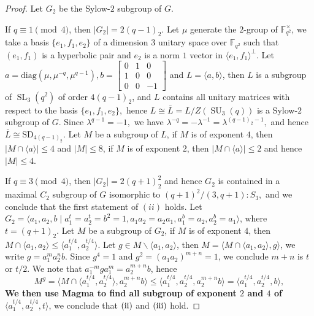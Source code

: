 \documentclass[12pt,reqno]{amsart}
\newcommand{\SL}{\operatorname{SL}}
\newcommand{\SU}{\operatorname{SU}}
\newcommand{\FF}{\mathbb{F}}
\newcommand{\lr}{\langle}
\newcommand{\rr}{\rangle}
\theoremstyle{plain}
\theoremstyle{definition}
\begin{document}
  \begin{proof}
  	Let $G_2$ be the Sylow-$2$ subgroup of $G$. 
  	
  	If $q\equiv 1 \pmod 4$, then $|G_2|=2(q-1)_2$. Let $\mu$ generate the $2$-group of $\FF_{q^2}^{\times}$, we take a basis $\{e_1,f_1,e_2\}$ of a dimension $3$ unitary space over $\FF_{q^2}$ such that $(e_1, f_1)$ is a hyperbolic pair and $e_2$ is a norm $1$ vector in $\lr e_1, f_1 \rr^{\perp}$. Let $a= \mathrm{diag}(\mu, \mu^{-q}, \mu^{q-1}), b=\begin{bmatrix}
  		0 & 1 & 0\\
  		1 & 0 & 0\\
  		0 & 0 & -1
  	\end{bmatrix}$ and $L=\lr a, b\rr$, then $L$ is a subgroup of $\SL_3(q^2)$ of order $4(q-1)_2$, and $L$ contains all unitary matrices with respect to the basis $\{e_1, f_1,e_2\},$ hence $L\cong \bar{L}=L/Z(\SU_3(q))$ is a Sylow-$2$ subgroup of $G$.
   Since $\lambda^{q-1}=-1,$ we have $\lambda^{-q}=-\lambda^{-1}=\lambda^{(q-1)_2-1},$ and hence $\bar{L}\cong \mathrm{SD}_{4(q-1)_2}.$ Let $M$ be a subgroup of $L$, if $M$ is of exponent $4$, then $|M\cap \lr a \rr| \le 4$ and $|M|\le 8$, if $M$ is of exponent $2$, then $|M\cap \lr a \rr|\le 2$ and hence $|M|\le 4$.
   
   If $q\equiv 3\pmod 4$, then $|G_2|=2(q+1)_2^2$ and hence $G_2$ is contained in a maximal $C_2$ subgroup of $G$ isomorphic to $(q+1)^2/(3,q+1){:}S_3,$ and we conclude that the first statement of $(ii)$ holds.  
   Let $G_2=\lr a_1,a_2,b\mid a_1^t=a_2^t=b^2=1,a_1a_2=a_2a_1,a_1^b=a_2,a_2^b=a_1 \rr$, where $t=(q+1)_2$. Let $M$ be a subgroup of $G_2$, if $M$ is of exponent $4$, then $M\cap \lr a_1, a_2 \rr \le \lr a_1^{t/4},a_2^{t/4}\rr$. Let $g\in M\backslash \lr a_1,a_2\rr$, then $M=\lr M\cap \lr a_1,a_2\rr, g  \rr$, we write $g=a_1^ma_2^nb$. Since $g^4=1$ and $g^2=(a_1a_2)^{m+n}=1$, we conclude $m+n$ is $t$ or $t/2$. We note that  $a_1^{-m}ga_1^m=a_2^{m+n}b$, hence 
   \begin{equation*}
   	M^g=\lr  M\cap \lr a_1^{t/4},a_2^{t/4} \rr, a_2^{m+n}b \rr \le \lr a_1^{t/4}, a_2^{t/4},a_2^{m+n}b\rr =\lr a_1^{t/4},a_2^{t/4},b \rr,
   \end{equation*}
   \textbf{We then use Magma to find all subgroup of exponent $2$ and $4$ of $\lr a_1^{t/4}, a_2^{t/4}, t\rr$}, we conclude that $\rm(ii)$ and $\rm(iii)$ hold. 
  \end{proof}
\end{document}
